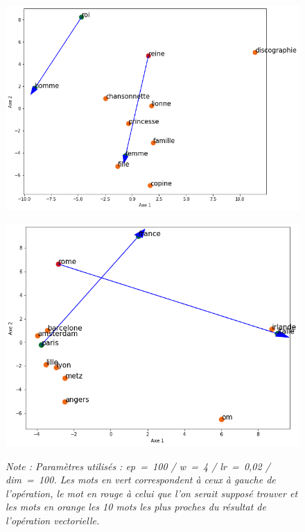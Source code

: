 \documentclass[11pt,french,french]{article}
\begin{document}
\begin{figure}[!h]
\begin{minipage}{.5\textwidth}
  \centering
  \includegraphics[width=0.92\linewidth]{img/acp_reine.png}
  \label{fig:acp_reine}
\end{minipage}%
\begin{minipage}{.5\textwidth}
  \centering
  \includegraphics[width=0.85\linewidth]{img/acp_rome.png}
  \label{fig:acp_rome}
\end{minipage}
\footnotesize
\emph{Note : Paramètres utilisés : ep = 100 / w = 4 / lr = 0,02 / dim = 100.\newline
Les mots en vert correspondent à ceux à gauche de l'opération, le mot en rouge à celui que l'on serait supposé trouver et les mots en orange les 10 mots les plus proches du résultat de l'opération vectorielle.}
\end{figure}
\end{document}
